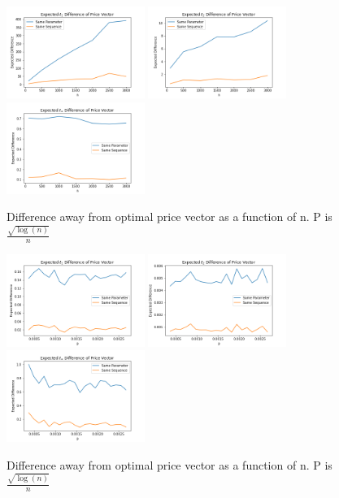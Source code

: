 \documentclass[12pt]{article}
\begin{document}
\begin{figure}[h]
  \centering
  \includegraphics[width=0.4\textwidth]{../results/aprice_vector_l1.png}
  \includegraphics[width=0.4\textwidth]{../results/aprice_vector_l2.png}
  \includegraphics[width=0.4\textwidth]{../results/aprice_vector_inf.png}
  \caption{Difference away from optimal price vector as a function of n. P is $\frac{\sqrt{\log(n)}}{n}$ }
\end{figure}

\begin{figure}[h]
  \centering
  \includegraphics[width=0.4\textwidth]{../results/vdif_vp_l1.png}
  \includegraphics[width=0.4\textwidth]{../results/vdif_vp_l2.png}
  \includegraphics[width=0.4\textwidth]{../results/vdif_vp_inf.png}
  \caption{Difference away from optimal price vector as a function of n. P is $\frac{\sqrt{\log(n)}}{n}$ }
\end{figure}
\end{document}
